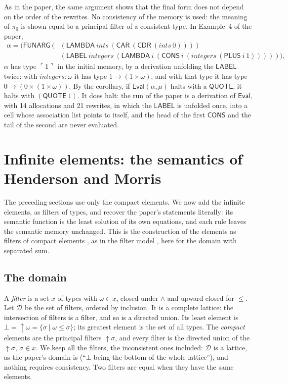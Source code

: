 \documentclass[11pt]{amsart}
\theoremstyle{definition}
\theoremstyle{remark}
\newcommand{\kw}[1]{\mathsf{#1}}
\newcommand{\at}[1]{\ulcorner #1\urcorner}
\newcommand{\D}{\mathcal D}
\newcommand{\up}{{\uparrow}}
\begin{document}
As in the paper, the same argument shows that the final form does not depend
on the order of the rewrites. No consistency of the memory is used: the
meaning of $\pi_0$ is shown equal to a principal filter of a consistent type.
In Example~4 of the paper,
\[
\begin{aligned}
\alpha=(\kw{FUNARG}\ (&(\kw{LAMBDA}\ \mathit{ints}\ (\kw{CAR}\ (\kw{CDR}\ (\mathit{ints}\ 0))))\\
&(\kw{LABEL}\ \mathit{integers}\ (\kw{LAMBDA}\ i\ (\kw{CONS}\ i\ (\mathit{integers}\ (\kw{PLUS}\ i\ 1)))))),
\end{aligned}
\]
$\alpha$ has type $\at 1$ in the initial memory, by a derivation unfolding the
$\kw{LABEL}$ twice: with $\mathit{integers}:\omega$ it has type
$1\to(1\times\omega)$, and with that type it has type
$0\to(0\times(1\times\omega))$. By the corollary, if $\kw{Eval}(\alpha,\mu)$
halts with a $\kw{QUOTE}$, it halts with $(\kw{QUOTE}\ 1)$. It does halt: the
run of the paper is a derivation of $\kw{Eval}$, with 14 allocations and 21
rewrites, in which the $\kw{LABEL}$ is unfolded once, into a cell whose
association list points to itself, and the head of the first $\kw{CONS}$ and
the tail of the second are never evaluated.

\section{Infinite elements: the semantics of Henderson and Morris}

The preceding sections use only the compact elements. We now add the
infinite elements, as filters of types, and recover the paper's statements
literally: its semantic function is the least solution of its own
equations, and each rule leaves the semantic memory unchanged. This is the
construction of the elements as filters of compact elements
\cite{ML83,Sco82,Abr91}, as in the filter model \cite{BCD83}, here for the
domain with separated sum.

\subsection{The domain}

A \emph{filter} is a set $x$ of types with $\omega\in x$, closed under
$\wedge$ and upward closed for $\le$. Let $\D$ be the set of filters,
ordered by inclusion. It is a complete lattice: the intersection of filters
is a filter, and so is a directed union. Its least element is
$\bot=\up\omega=\{\sigma\mid\omega\le\sigma\}$; its greatest element is the
set of all types. The \emph{compact} elements are the principal filters
$\up\sigma$, and every filter is the directed union of the $\up\sigma$,
$\sigma\in x$. We keep all the filters, the inconsistent ones included:
$\D$ is a lattice, as the paper's domain is (``$\bot$ being the bottom of
the whole lattice''), and nothing requires consistency. Two filters are
equal when they have the same elements.
\end{document}
